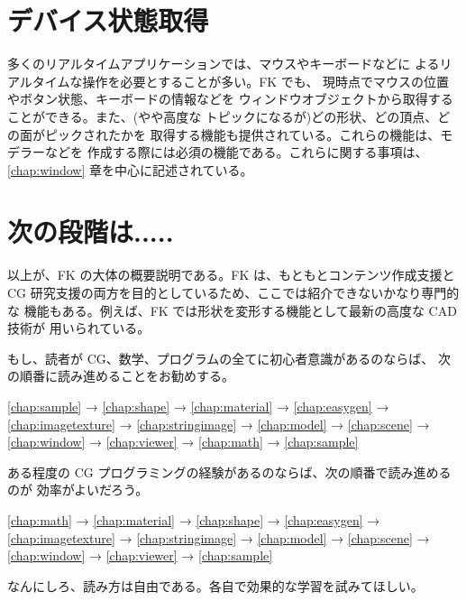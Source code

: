 \section{デバイス状態取得}
多くのリアルタイムアプリケーションでは、マウスやキーボードなどに
よるリアルタイムな操作を必要とすることが多い。FK でも、
現時点でマウスの位置やボタン状態、キーボードの情報などを
ウィンドウオブジェクトから取得することができる。また、(やや高度な
トピックになるが)どの形状、どの頂点、どの面がピックされたかを
取得する機能も提供されている。これらの機能は、モデラーなどを
作成する際には必須の機能である。これらに関する事項は、
\ref{chap:window} 章を中心に記述されている。

\section{次の段階は.....}
以上が、FK の大体の概要説明である。FK は、もともとコンテンツ作成支援と
CG 研究支援の両方を目的としているため、ここでは紹介できないかなり専門的な
機能もある。例えば、FK では形状を変形する機能として最新の高度な CAD 技術が
用いられている。

もし、読者が CG、数学、プログラムの全てに初心者意識があるのならば、
次の順番に読み進めることをお勧めする。
\begin{center}
\ref{chap:sample} → \ref{chap:shape} → \ref{chap:material} →
\ref{chap:easygen} → \ref{chap:imagetexture} → \ref{chap:stringimage} →
\ref{chap:model} → \ref{chap:scene} → \ref{chap:window} →
\ref{chap:viewer} → \ref{chap:math} → \ref{chap:sample} 
\end{center}
ある程度の CG プログラミングの経験があるのならば、次の順番で読み進めるのが
効率がよいだろう。
\begin{center}
\ref{chap:math} → \ref{chap:material} → \ref{chap:shape} →
\ref{chap:easygen} → \ref{chap:imagetexture} → \ref{chap:stringimage} →
\ref{chap:model} → \ref{chap:scene} → \ref{chap:window} →
\ref{chap:viewer} → \ref{chap:sample}
\end{center}

なんにしろ、読み方は自由である。各自で効果的な学習を試みてほしい。
